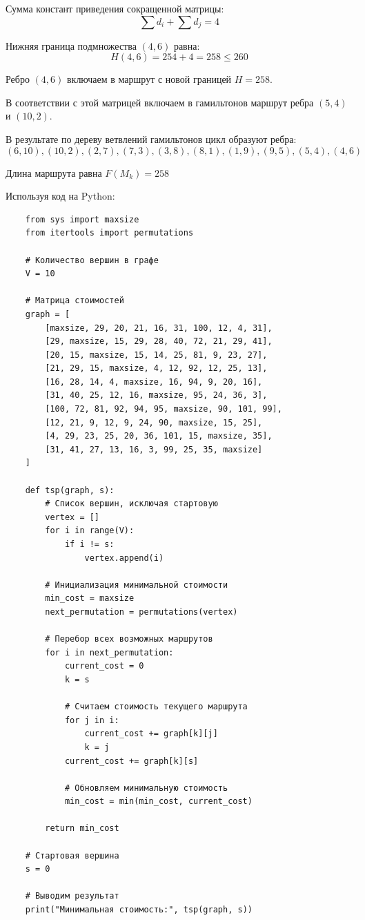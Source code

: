 \documentclass{article}
\begin{document}
Сумма констант приведения сокращенной матрицы:
\[
    \sum d_i + \sum d_j = 4
\]

Нижняя граница подмножества $(4,6)$ равна:
\[
    H(4,6) = 254 + 4 = 258 \leq 260
\]

Ребро $(4,6)$ включаем в маршрут с новой границей $H=258$.

В соответствии с этой матрицей включаем в гамильтонов маршрут ребра $(5,4)$ и $(10,2)$.

В результате по дереву ветвлений гамильтонов цикл образуют ребра:
\[
    (6,10), (10,2), (2,7), (7,3), (3,8), (8,1), (1,9), (9,5), (5,4), (4,6)
\]

Длина маршрута равна $F(M_k) = 258$

Используя код на Python:

\begin{verbatim}
    from sys import maxsize
    from itertools import permutations
    
    # Количество вершин в графе
    V = 10
    
    # Матрица стоимостей
    graph = [
        [maxsize, 29, 20, 21, 16, 31, 100, 12, 4, 31],
        [29, maxsize, 15, 29, 28, 40, 72, 21, 29, 41],
        [20, 15, maxsize, 15, 14, 25, 81, 9, 23, 27],
        [21, 29, 15, maxsize, 4, 12, 92, 12, 25, 13],
        [16, 28, 14, 4, maxsize, 16, 94, 9, 20, 16],
        [31, 40, 25, 12, 16, maxsize, 95, 24, 36, 3],
        [100, 72, 81, 92, 94, 95, maxsize, 90, 101, 99],
        [12, 21, 9, 12, 9, 24, 90, maxsize, 15, 25],
        [4, 29, 23, 25, 20, 36, 101, 15, maxsize, 35],
        [31, 41, 27, 13, 16, 3, 99, 25, 35, maxsize]
    ]
    
    def tsp(graph, s):
        # Список вершин, исключая стартовую
        vertex = []
        for i in range(V):
            if i != s:
                vertex.append(i)
        
        # Инициализация минимальной стоимости
        min_cost = maxsize
        next_permutation = permutations(vertex)
        
        # Перебор всех возможных маршрутов
        for i in next_permutation:
            current_cost = 0
            k = s
            
            # Считаем стоимость текущего маршрута
            for j in i:
                current_cost += graph[k][j]
                k = j
            current_cost += graph[k][s]
            
            # Обновляем минимальную стоимость
            min_cost = min(min_cost, current_cost)
        
        return min_cost
    
    # Стартовая вершина
    s = 0
    
    # Выводим результат
    print("Минимальная стоимость:", tsp(graph, s))
\end{verbatim}
\end{document}
